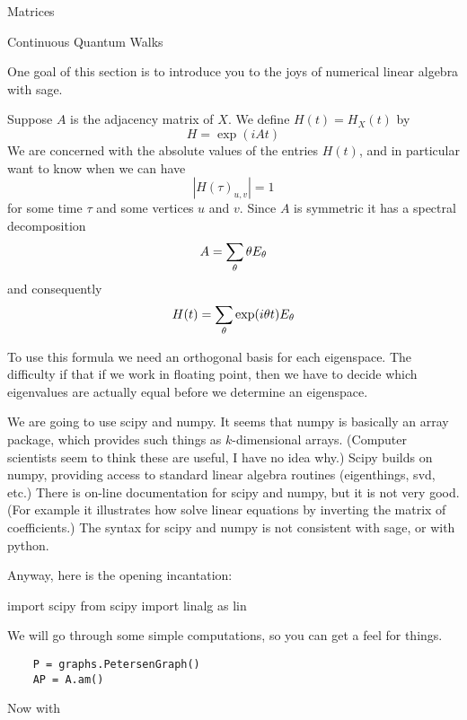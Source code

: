 \begin{chap}{Matrices}
%
\begin{sect}{Continuous Quantum Walks}
%
\begin{para}
One goal of this section is to introduce you to the joys of numerical linear
algebra with sage.
\end{para}
%
\begin{para}
Suppose $A$ is the adjacency matrix of $X$. We define $H(t)=H_X(t)$ by
\[
    H =\exp(iAt)
\]
We are concerned with the absolute values of the entries $H(t)$, and in particular
want to know when we can have
\[
    |H(\tau)_{u,v}| =1
\]
for some time $\tau$ and some vertices $u$ and $v$. Since $A$ is symmetric 
it has a spectral decomposition
\[
    A =\sum_\theta \theta E_\theta
\]
and consequently
\[
    H(t) = \sum_\theta \exp(i\theta t)E_\theta
\]
\end{para}
%
\begin{para}
To use this formula we need an orthogonal basis for each eigenspace.
The difficulty if that if we work in floating point, then we have
to decide which eigenvalues are actually equal before we determine
an eigenspace.
\end{para}
%
\begin{para}
We are going to use scipy and numpy. 
It seems that numpy is basically an array package, which 
provides such things as $k$-dimensional arrays. (Computer scientists seem
to think these are useful, I have no idea why.) Scipy builds on numpy, providing
access to standard linear algebra routines (eigenthings, svd, etc.)
There is on-line documentation for scipy and numpy, but it is not very good.
(For example it illustrates how solve linear equations by inverting the matrix 
of coefficients.) The syntax for scipy and numpy is not consistent with sage, or 
with python. 
\end{para}
%
\begin{para}
Anyway, here is the opening incantation:
\end{para}
%
\begin{sageblock}
import scipy
from scipy import linalg as lin
\end{sageblock}
%
\begin{para}
We will go through some simple computations, so you can get a feel for things.
\end{para}
%
\begin{verbatim}
    P = graphs.PetersenGraph()
    AP = A.am()
\end{verbatim}
%
\begin{para}
Now with

\end{para}
\end{sect}
\end{chap}
